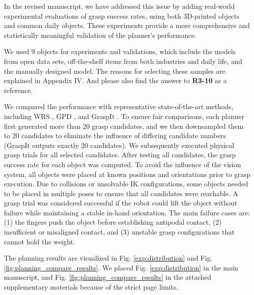 \documentclass[journal]{IEEEtran}
\begin{document}
In the revised manuscript, we have addressed this issue by adding real-world experimental evaluations of grasp success rates, using both 3D-printed objects and common daily objects. These experiments provide a more comprehensive and statistically meaningful validation of the planner’s performance.

We used 9 objects for experiments and validations, which include the models from open data sets, off-the-shelf items from both industries and daily life, and the manually designed model. The reasons for selecting these samples are explained in Appendix IV. And please also find the answer to \textbf{R3-10} as a reference. 

We compared the performance with representative state-of-the-art methods, including WRS \cite{wan2020planning}, GPD \cite{ten2017grasp}, and GraspIt \cite{miller_graspit_2021}.
To ensure fair comparisons, each planner first generated more than 20 grasp candidates, and we then downsampled them to 20 candidates to eliminate the influence of differing candidate numbers (GraspIt outputs exactly 20 candidates). We subsequently executed physical grasp trials for all selected candidates.
After testing all candidates, the grasp success rate for each object was computed. To avoid the influence of the vision system, all objects were placed at known positions and orientations prior to grasp execution. Due to collisions or unsolvable IK configurations, some objects needed to be placed in multiple poses to ensure that all candidates were reachable. A grasp trial was considered successful if the robot could lift the object without failure while maintaining a stable in-hand orientation. The main failure cases are: (1) the fingers push the object before establishing antipodal contact, (2) insufficient or misaligned contact, and (3) unstable grasp configurations that cannot hold the weight.

The planning results are visualized in Fig. \ref{exp:distribution} and Fig. \ref{fig:planning_compare_results}. We placed Fig. \ref{exp:distribution} in the main manuscript, and Fig. \ref{fig:planning_compare_results} in the attached supplementary materials because of the strict page limits.
\end{document}
